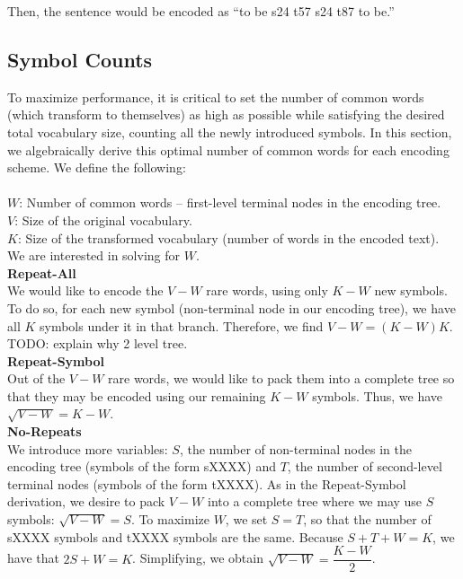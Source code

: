 Then, the sentence would be encoded as ``to be s24 t57 s24 t87 to be.''

\subsection{Symbol Counts}
To maximize performance, it is critical to set the number of common words (which
transform to themselves) as high as possible while satisfying the desired total vocabulary size,
counting all the newly introduced symbols. In this section, we algebraically derive
this optimal number of common words for each encoding scheme. We define the following:\\\\
$W$: Number of common words -- first-level terminal nodes in the encoding tree.\\
$V$: Size of the original vocabulary.\\
$K$: Size of the transformed vocabulary (number of words in the encoded text).\\

We are interested in solving for $W$.\\

\textbf{Repeat-All}\\
We would like to encode the $V - W$ rare words, using only $K - W$ new symbols. To do so,
for each new symbol (non-terminal node in our encoding tree), we have all $K$ symbols under
it in that branch. Therefore, we find $V - W = (K - W)K$.\\

TODO: explain why 2 level tree.\\

\textbf{Repeat-Symbol}\\
Out of the $V - W$ rare words, we would like to pack them into a complete tree so that
they may be encoded using our remaining $K - W$ symbols. Thus, we have $\sqrt{V - W} = K - W$.\\

\textbf{No-Repeats}\\
We introduce more variables: $S$, the number of non-terminal nodes in the encoding tree (symbols
of the form sXXXX) and $T$, the number of second-level terminal nodes (symbols of the form tXXXX).
As in the Repeat-Symbol derivation, we desire to pack $V - W$ into a complete tree where we
may use $S$ symbols: $\sqrt{V - W} = S$. To maximize $W$, we set $S = T$, so that the number of sXXXX symbols and tXXXX
symbols are the same. Because $S + T + W = K$, we have that $2S + W = K$. Simplifying, we obtain
$\sqrt{V - W} = \dfrac{K - W}{2}$.\\